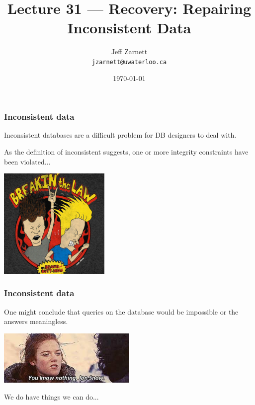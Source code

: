 

\title{Lecture 31 --- Recovery: Repairing Inconsistent Data}

\author{Jeff Zarnett \\ \small \texttt{jzarnett@uwaterloo.ca}}
\date{\today}




\begin{frame}
  \titlepage

 \end{frame}


\begin{frame}
\frametitle{Inconsistent data}

Inconsistent databases are a difficult problem for DB designers to deal with. 

As the definition of inconsistent suggests, one or more integrity constraints have been violated... 

\begin{center}
	\includegraphics[width=0.4\textwidth]{images/breakingthelaw.jpg}
\end{center}


 \end{frame}


\begin{frame}
\frametitle{Inconsistent data}

One might conclude that queries on the database would be impossible or the answers meaningless.

\begin{center}
	\includegraphics[width=0.5\textwidth]{images/jonsnow.jpg}
\end{center}

We do have things we can do...

\end{frame}


